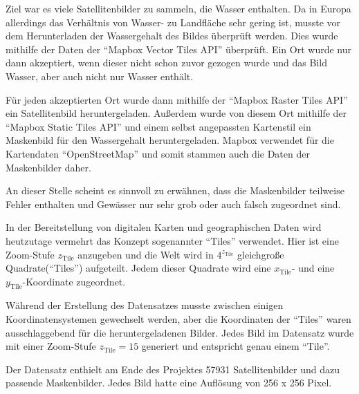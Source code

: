 Ziel war es viele Satellitenbilder zu sammeln, die Wasser enthalten.
Da in Europa allerdings das Verhältnis von Wasser- zu Landfläche sehr gering ist, musste vor dem Herunterladen der Wassergehalt des Bildes überprüft werden.
Dies wurde mithilfe der Daten der \enquote{Mapbox Vector Tiles API} überprüft. \cite{mapbox_vector_tiles}
Ein Ort wurde nur dann akzeptiert, wenn dieser nicht schon zuvor gezogen wurde und das Bild Wasser, aber auch nicht nur Wasser enthält.

Für jeden akzeptierten Ort wurde dann mithilfe der \enquote{Mapbox Raster Tiles API} ein Satellitenbild heruntergeladen.\cite{mapbox_raster_tiles}
Außerdem wurde von diesem Ort mithilfe der \enquote{Mapbox Static Tiles API} und einem selbst angepassten Kartenstil ein Maskenbild für den Wassergehalt heruntergeladen.\cite{mapbox_static_tiles}
Mapbox verwendet für die Kartendaten \enquote{OpenStreetMap} und somit stammen auch die Daten der Maskenbilder daher.\cite{OpenStreetMap}

An dieser Stelle scheint es sinnvoll zu erwähnen, dass die Maskenbilder teilweise Fehler enthalten und Gewässer nur sehr grob oder auch falsch zugeordnet sind. 

In der Bereitstellung von digitalen Karten und geographischen Daten wird heutzutage vermehrt das Konzept sogenannter \enquote{Tiles} verwendet.\cite{tiles}
Hier ist eine Zoom-Stufe $z_\text{Tile}$ anzugeben und die Welt wird in $4^{z_\text{Tile}}$ gleichgroße Quadrate(\enquote{Tiles}) aufgeteilt.
Jedem dieser Quadrate wird eine $x_\text{Tile}$- und eine $y_\text{Tile}$-Koordinate zugeordnet.

Während der Erstellung des Datensatzes musste zwischen einigen Koordinatensystemen gewechselt werden, aber die Koordinaten der \enquote{Tiles} waren ausschlaggebend für die heruntergeladenen Bilder.
Jedes Bild im Datensatz wurde mit einer Zoom-Stufe $z_\text{Tile} = 15$ generiert und entspricht genau einem \enquote{Tile}.

Der Datensatz enthielt am Ende des Projektes 57931 Satellitenbilder und dazu passende Maskenbilder.
Jedes Bild hatte eine Auflösung von 256 x 256 Pixel.
